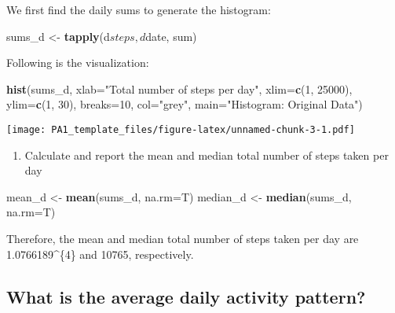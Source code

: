 \documentclass[]{article}
\newenvironment{Shaded}{\begin{snugshade}}{\end{snugshade}}
\newcommand{\KeywordTok}[1]{\textcolor[rgb]{0.13,0.29,0.53}{\textbf{{#1}}}}
\newcommand{\DataTypeTok}[1]{\textcolor[rgb]{0.13,0.29,0.53}{{#1}}}
\newcommand{\DecValTok}[1]{\textcolor[rgb]{0.00,0.00,0.81}{{#1}}}
\newcommand{\StringTok}[1]{\textcolor[rgb]{0.31,0.60,0.02}{{#1}}}
\newcommand{\NormalTok}[1]{{#1}}
\providecommand{\tightlist}{%
  \setlength{\itemsep}{0pt}\setlength{\parskip}{0pt}}
\begin{document}
We first find the daily sums to generate the histogram:

\begin{Shaded}
\begin{Highlighting}[]
\NormalTok{sums_d <-}\StringTok{ }\KeywordTok{tapply}\NormalTok{(d$steps, d$date, sum)}
\end{Highlighting}
\end{Shaded}

Following is the visualization:

\begin{Shaded}
\begin{Highlighting}[]
\KeywordTok{hist}\NormalTok{(sums_d, }\DataTypeTok{xlab=}\StringTok{"Total number of steps per day"}\NormalTok{,}
     \DataTypeTok{xlim=}\KeywordTok{c}\NormalTok{(}\DecValTok{1}\NormalTok{, }\DecValTok{25000}\NormalTok{), }\DataTypeTok{ylim=}\KeywordTok{c}\NormalTok{(}\DecValTok{1}\NormalTok{, }\DecValTok{30}\NormalTok{), }\DataTypeTok{breaks=}\DecValTok{10}\NormalTok{, }\DataTypeTok{col=}\StringTok{"grey"}\NormalTok{,}
     \DataTypeTok{main=}\StringTok{"Histogram: Original Data"}\NormalTok{)}
\end{Highlighting}
\end{Shaded}

\texttt{[image: PA1\_template\_files/figure-latex/unnamed-chunk-3-1.pdf]}

\begin{enumerate}
\def\labelenumi{\arabic{enumi}.}
\setcounter{enumi}{1}
\tightlist
\item
  Calculate and report the mean and median total number of steps taken
  per day
\end{enumerate}

\begin{Shaded}
\begin{Highlighting}[]
\NormalTok{mean_d <-}\StringTok{ }\KeywordTok{mean}\NormalTok{(sums_d, }\DataTypeTok{na.rm=}\NormalTok{T)}
\NormalTok{median_d <-}\StringTok{ }\KeywordTok{median}\NormalTok{(sums_d, }\DataTypeTok{na.rm=}\NormalTok{T)}
\end{Highlighting}
\end{Shaded}

Therefore, the mean and median total number of steps taken per day are
1.0766189\^{}\{4\} and 10765, respectively.

\subsection{What is the average daily activity
pattern?}\label{what-is-the-average-daily-activity-pattern}
\end{document}

